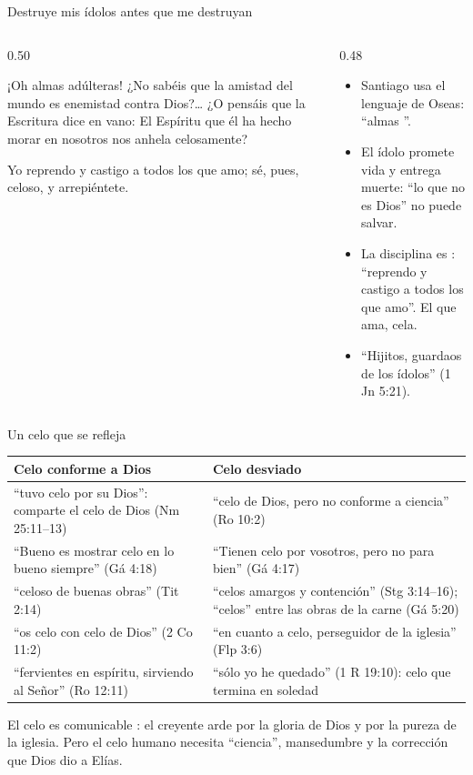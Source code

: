 \begin{frame}{Destruye mis ídolos antes que me destruyan}
\begin{columns}[t,onlytextwidth]
\begin{column}{0.50\textwidth}
\begin{cita}¡Oh almas adúlteras! ¿No sabéis que la amistad del mundo es enemistad contra Dios?\ldots{} ¿O pensáis que la Escritura dice en vano: El Espíritu que él ha hecho morar en nosotros nos anhela celosamente?\end{cita}
\begin{cita}Yo reprendo y castigo a todos los que amo; sé, pues, celoso, y arrepiéntete.\end{cita}
\end{column}
\begin{column}{0.48\textwidth}\small
\begin{itemize}
\item Santiago usa el lenguaje de Oseas: ``almas ''.
\item El ídolo promete vida y entrega muerte: ``lo que no es Dios'' no puede salvar.
\item La disciplina es : ``reprendo y castigo a todos los que amo''. El que ama, cela.
\item ``Hijitos, guardaos de los ídolos'' (1 Jn 5:21).
\end{itemize}
\end{column}
\end{columns}
\end{frame}

\begin{frame}{Un celo que se refleja}
\scriptsize\renewcommand{\arraystretch}{1.2}
\begin{tabular}{@{}>{\RaggedRight\arraybackslash}p{5.8cm}>{\RaggedRight\arraybackslash}p{6.0cm}@{}}
\toprule
\textbf{Celo conforme a Dios} & \textbf{Celo desviado} \\ \midrule
``tuvo celo por su Dios'': comparte el celo de Dios (Nm 25:11--13) & ``celo de Dios, pero no conforme a ciencia'' (Ro 10:2) \\
``Bueno es mostrar celo en lo bueno siempre'' (Gá 4:18) & ``Tienen celo por vosotros, pero no para bien'' (Gá 4:17) \\
``celoso de buenas obras'' (Tit 2:14) & ``celos amargos y contención'' (Stg 3:14--16); ``celos'' entre las obras de la carne (Gá 5:20) \\
``os celo con celo de Dios'' (2 Co 11:2) & ``en cuanto a celo, perseguidor de la iglesia'' (Flp 3:6) \\
``fervientes en espíritu, sirviendo al Señor'' (Ro 12:11) & ``sólo yo he quedado'' (1 R 19:10): celo que termina en soledad \\
\bottomrule
\end{tabular}\par\medskip
\small\RaggedRight El celo es comunicable : el creyente arde por la gloria de Dios y por la pureza de la iglesia. Pero el celo humano necesita ``ciencia'', mansedumbre y la corrección que Dios dio a Elías.
\end{frame}

